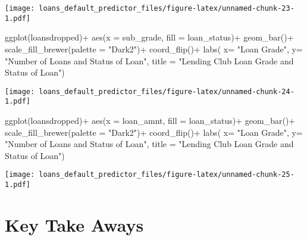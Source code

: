 \documentclass[
]{article}
\newenvironment{Shaded}{\begin{snugshade}}{\end{snugshade}}
\newcommand{\AttributeTok}[1]{\textcolor[rgb]{0.77,0.63,0.00}{#1}}
\newcommand{\FunctionTok}[1]{\textcolor[rgb]{0.00,0.00,0.00}{#1}}
\newcommand{\NormalTok}[1]{#1}
\newcommand{\SpecialCharTok}[1]{\textcolor[rgb]{0.00,0.00,0.00}{#1}}
\newcommand{\StringTok}[1]{\textcolor[rgb]{0.31,0.60,0.02}{#1}}
\begin{document}
\texttt{[image: loans\_default\_predictor\_files/figure-latex/unnamed-chunk-23-1.pdf]}

\begin{Shaded}
\begin{Highlighting}[]
\FunctionTok{ggplot}\NormalTok{(loansdropped)}\SpecialCharTok{+}
  \FunctionTok{aes}\NormalTok{(}\AttributeTok{x =}\NormalTok{ sub\_grade, }\AttributeTok{fill =}\NormalTok{ loan\_status)}\SpecialCharTok{+}
     \FunctionTok{geom\_bar}\NormalTok{()}\SpecialCharTok{+}
    \FunctionTok{scale\_fill\_brewer}\NormalTok{(}\AttributeTok{palette =} \StringTok{"Dark2"}\NormalTok{)}\SpecialCharTok{+}
  \FunctionTok{coord\_flip}\NormalTok{()}\SpecialCharTok{+}
\FunctionTok{labs}\NormalTok{( }\AttributeTok{x=} \StringTok{"Loan Grade"}\NormalTok{,}
        \AttributeTok{y=} \StringTok{"Number of Loans and Status of Loan"}\NormalTok{,}
        \AttributeTok{title =} \StringTok{"Lending Club Loan Grade and Status of Loan"}\NormalTok{)}
\end{Highlighting}
\end{Shaded}

\texttt{[image: loans\_default\_predictor\_files/figure-latex/unnamed-chunk-24-1.pdf]}

\begin{Shaded}
\begin{Highlighting}[]
\FunctionTok{ggplot}\NormalTok{(loansdropped)}\SpecialCharTok{+}
  \FunctionTok{aes}\NormalTok{(}\AttributeTok{x =}\NormalTok{ loan\_amnt, }\AttributeTok{fill =}\NormalTok{ loan\_status)}\SpecialCharTok{+}
     \FunctionTok{geom\_bar}\NormalTok{()}\SpecialCharTok{+}
    \FunctionTok{scale\_fill\_brewer}\NormalTok{(}\AttributeTok{palette =} \StringTok{"Dark2"}\NormalTok{)}\SpecialCharTok{+}
  \FunctionTok{coord\_flip}\NormalTok{()}\SpecialCharTok{+}
\FunctionTok{labs}\NormalTok{( }\AttributeTok{x=} \StringTok{"Loan Grade"}\NormalTok{,}
        \AttributeTok{y=} \StringTok{"Number of Loans and Status of Loan"}\NormalTok{,}
        \AttributeTok{title =} \StringTok{"Lending Club Loan Grade and Status of Loan"}\NormalTok{)}
\end{Highlighting}
\end{Shaded}

\texttt{[image: loans\_default\_predictor\_files/figure-latex/unnamed-chunk-25-1.pdf]}

\hypertarget{key-take-aways}{%
\section{Key Take Aways}\label{key-take-aways}}
\end{document}
